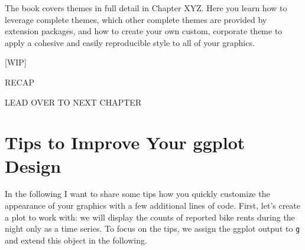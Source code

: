 \documentclass[
]{krantz}
\begin{document}
The book covers themes in full detail in Chapter XYZ. Here you learn how to leverage complete themes, which other complete themes are provided by extension packages, and how to create your own custom, corporate theme to apply a cohesive and easily reproducible style to all of your graphics.

{[}WIP{]}

RECAP

LEAD OVER TO NEXT CHAPTER

\hypertarget{tips-to-improve-your-ggplot-design}{%
\chapter{Tips to Improve Your ggplot Design}\label{tips-to-improve-your-ggplot-design}}

In the following I want to share some tips how you quickly customize the appearance of your graphics with a few additional lines of code. First, let's create a plot to work with: we will display the counts of reported bike rents during the night only as a time series. To focus on the tips, we assign the ggplot output to \texttt{g} and extend this object in the following.
\end{document}
